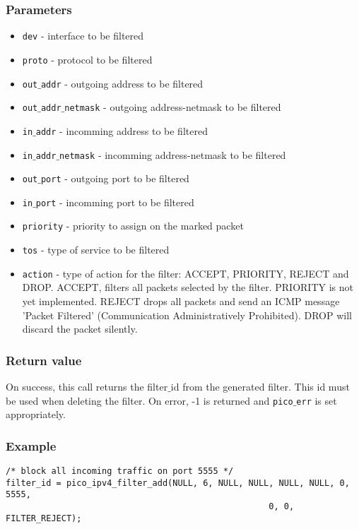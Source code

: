\subsubsection*{Parameters}
\begin{itemize}[noitemsep]
\item \texttt{dev} - interface to be filtered
\item \texttt{proto} - protocol to be filtered
\item \texttt{out$\_$addr} - outgoing address to be filtered
\item \texttt{out$\_$addr$\_$netmask} - outgoing address-netmask to be filtered
\item \texttt{in$\_$addr} - incomming address to be filtered
\item \texttt{in$\_$addr$\_$netmask} - incomming address-netmask to be filtered
\item \texttt{out$\_$port} - outgoing port to be filtered
\item \texttt{in$\_$port} - incomming port to be filtered
\item \texttt{priority} - priority to assign on the marked packet
\item \texttt{tos} - type of service to be filtered
\item \texttt{action} - type of action for the filter: ACCEPT, PRIORITY, REJECT and DROP. ACCEPT, filters all packets selected by the filter. PRIORITY is not yet implemented. REJECT drops all packets and send an ICMP message 'Packet Filtered' (Communication Administratively Prohibited). DROP will discard the packet silently.
\end{itemize}

\subsubsection*{Return value}
On success, this call returns the filter$\_$id from the generated filter. This id must be used when deleting the filter.
On error, -1 is returned and \texttt{pico$\_$err} is set appropriately.

\subsubsection*{Example}
\begin{verbatim}
/* block all incoming traffic on port 5555 */
filter_id = pico_ipv4_filter_add(NULL, 6, NULL, NULL, NULL, NULL, 0, 5555,
													0, 0, FILTER_REJECT);
\end{verbatim}

